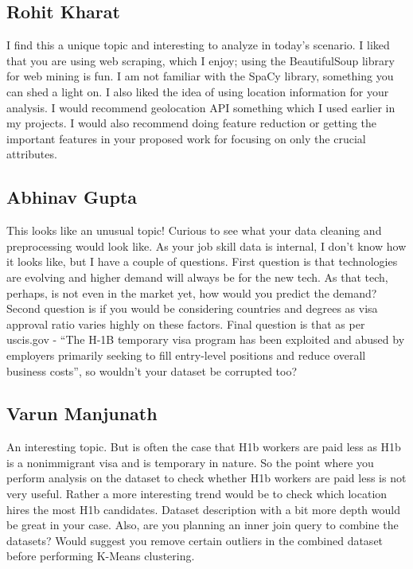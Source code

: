 \subsection*{Rohit Kharat}
I find this a unique topic and interesting to analyze in today's scenario. I liked that you are using web scraping, which I enjoy; using the BeautifulSoup library for web mining is fun. I am not familiar with the SpaCy library, something you can shed a light on. I also liked the idea of using location information for your analysis. I would recommend geolocation API something which I used earlier in my projects. I would also recommend doing feature reduction or getting the important features in your proposed work for focusing on only the crucial attributes. 

\subsection*{Abhinav Gupta}
This looks like an unusual topic! Curious to see what your data cleaning and preprocessing would look like.
As your job skill data is internal, I don't know how it looks like, but I have a couple of questions. First question is that technologies are evolving and higher demand will always be for the new tech. As that tech, perhaps, is not even in the market yet, how would you predict the demand? Second question is if you would be considering countries and degrees as visa approval ratio varies highly on these factors. Final question is that as per uscis.gov - “The H-1B temporary visa program has been exploited and abused by employers primarily seeking to fill entry-level positions and reduce overall business costs”, so wouldn't your dataset be corrupted too?

\subsection*{Varun Manjunath}
An interesting topic. But is often the case that H1b workers are paid less as H1b is a nonimmigrant visa and is temporary in nature. So the point where you perform analysis on the dataset to check whether H1b workers are paid less is not very useful. Rather a more interesting trend would be to check which location hires the most H1b candidates. Dataset description with a bit more depth would be great in your case. Also, are you planning an inner join query to combine the datasets? Would suggest you remove certain outliers in the combined dataset before performing K-Means clustering.

